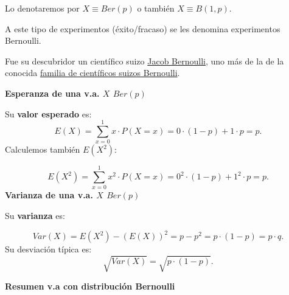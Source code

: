 \documentclass[]{book}
\begin{document}
Lo denotaremos por \(X\equiv Ber(p)\) o también \(X\equiv B(1,p).\)

A este tipo de experimentos (éxito/fracaso) se les denomina experimentos Bernoulli.

Fue su descubridor un científico suizo \href{https://es.wikipedia.org/wiki/Jakob_Bernoulli}{Jacob Bernoulli}, uno más de la de la conocida \href{https://es.wikipedia.org/wiki/Familia_Bernoulli}{familia de científicos suizos Bernoulli}.

\textbf{Esperanza de una v.a. \(X\) \(Ber(p)\)}

Su \textbf{valor esperado} es:
\[E(X)=\displaystyle\sum_{x=0}^1 x\cdot P(X=x)= 0\cdot(1-p)+1\cdot p=p.\]
Calculemos también \(E(X^2)\):

\[E(X^2)=\displaystyle\sum_{x=0}^1 x^2\cdot P(X=x)= 0^2\cdot(1-p)+1^2\cdot p=p.\]
\textbf{Varianza de una v.a. \(X\) \(Ber(p)\)}

Su \textbf{varianza} es:

\[Var(X)=E(X^2)-\left(E(X)\right)^2=p-p^2=p\cdot (1-p)=p\cdot q.\]
Su desviación típica es:
\[
\sqrt{Var(X)}=\sqrt{p \cdot (1-p)}.
\]

\textbf{Resumen v.a con distribución Bernoulli}
\end{document}
